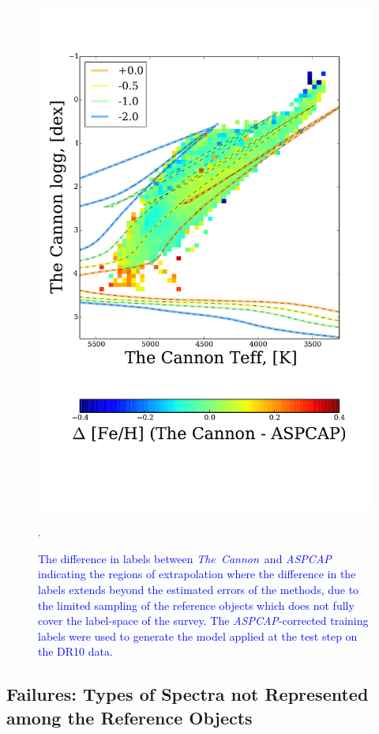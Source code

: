 \documentclass[12pt, preprint]{aastex}
\newcommand{\tc}{\textsl{The~Cannon}}
\newcommand{\aspcap}{\textsl{ASPCAP}}
\begin{document}
\begin{figure}[!h]
    \includegraphics[scale=0.26]{./plots/aftersubmit/feh_diff2.pdf}
    \caption{\textcolor{blue}{The difference in labels between \tc\ and \aspcap\, indicating the regions of extrapolation where the difference in the labels extends beyond the estimated errors of the methods, due to the limited sampling of the reference objects which does not fully cover the label-space of the survey. The \aspcap-corrected training labels were used to generate the model applied at the test step on the DR10 data.}}
    \label{fig:sigma2}.
\end{figure}




\subsection{Failures: Types of Spectra not Represented among the Reference Objects}
\label{sec:AnomalousSpectra}
\end{document}
